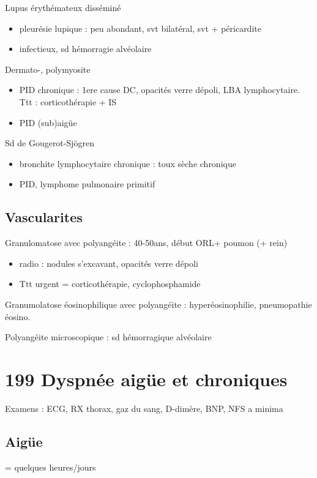 \documentclass{book}
\begin{document}
Lupus érythémateux disséminé 

\begin{itemize}
\item pleurésie lupique : peu abondant, svt bilatéral, svt + péricardite
\item infectieux, sd hémorragie alvéolaire
\end{itemize}

Dermato-, polymyosite

\begin{itemize}
\item PID chronique : 1ere cause DC, opacités verre dépoli, \gls{LBA} lymphocytaire.
Ttt : corticothérapie + IS
\item PID (sub)aigüe
\end{itemize}

Sd de Gougerot-Sjögren

\begin{itemize}
\item bronchite lymphocytaire chronique : toux sèche chronique
\item PID, lymphome pulmonaire primitif
\end{itemize}


\subsection{Vascularites}
\label{sec:orga4b1e30}
Granulomatose avec polyangéite : 40-50ans, début ORL+ poumon (+ rein)

\begin{itemize}
\item radio : nodules s'excavant, opacités verre dépoli
\item Ttt urgent = corticothérapie, cyclophosphamide
\end{itemize}

Granumolatose éosinophilique avec polyangéite :  hyperéosinophilie, pneumopathie
éosino.

Polyangéite microscopique : sd hémorragique alvéolaire

\section{199 \textdagger{} Dyspnée aigüe et chroniques}
\label{sec:orgd96933b}
\label{sec:199_dyspnee_aigue_et_chronique}
Examens : ECG, RX thorax, gaz du sang, D-dimère, BNP, NFS a minima

\subsection{Aigüe}
\label{sec:orgff599cb}
= quelques heures/jours
\end{document}
